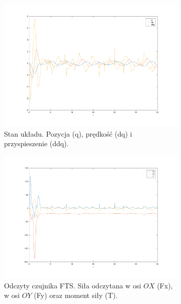 \documentclass[a4paper, 10pt]{article}
\begin{document}
\begin{figure}
	\centering
	\begin{subfigure}{.5\textwidth}
		\centering
		\includegraphics[width=\linewidth]{kompensacja_p}
		\caption{Stan układu. Pozycja (q), prędkość (dq) i przyspieszenie (ddq).}
		\label{fig:kompensacja_p}
	\end{subfigure}%
	\begin{subfigure}{.5\textwidth}
		\centering
		\includegraphics[width=\linewidth]{kompensacja_s}
		\caption{Odczyty czujnika FTS. Siła odczytana w osi $OX$ (Fx), w osi $OY$ (Fy) oraz moment siły (T).}
		\label{fig:kompensacja_s}
	\end{subfigure}
	\begin{subfigure}{.5\textwidth}
		\centering

\end{subfigure}
\end{figure}
\end{document}
